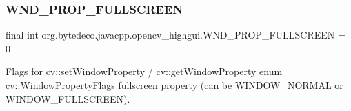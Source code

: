 \subsubsection{\texorpdfstring{W\+N\+D\+\_\+\+P\+R\+O\+P\+\_\+\+F\+U\+L\+L\+S\+C\+R\+E\+EN}{WND\_PROP\_FULLSCREEN}}
{\footnotesize\ttfamily final int org.\+bytedeco.\+javacpp.\+opencv\+\_\+highgui.\+W\+N\+D\+\_\+\+P\+R\+O\+P\+\_\+\+F\+U\+L\+L\+S\+C\+R\+E\+EN = 0\hspace{0.3cm}{\ttfamily [static]}}

Flags for cv\+::set\+Window\+Property / cv\+::get\+Window\+Property enum cv\+::\+Window\+Property\+Flags fullscreen property (can be W\+I\+N\+D\+O\+W\+\_\+\+N\+O\+R\+M\+AL or W\+I\+N\+D\+O\+W\+\_\+\+F\+U\+L\+L\+S\+C\+R\+E\+EN). 